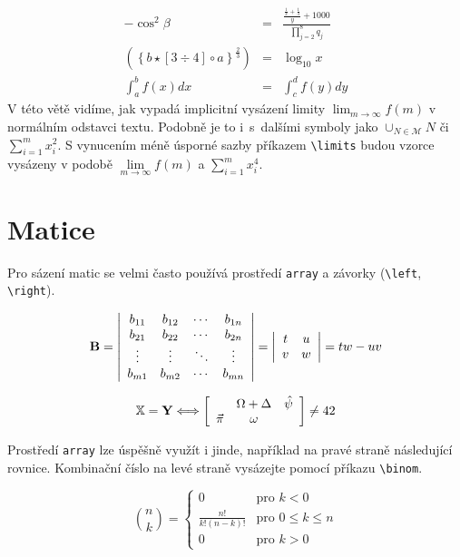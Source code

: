 \documentclass[twocolumn,11pt]{article}
\theoremstyle{definition}
\theoremstyle{plain}
\begin{document}
\begin{eqnarray}
- \cos^2 \beta & = & \frac{\frac{\frac{1}{x} + \frac{1}{3}}{y} + 1000}{\prod\limits^8_{j = 2} q_j} \\
\left(\left\{b \star \left[3 \div 4\right] \circ a \right\}^{\frac{2}{3}}\right) & = & \log_{10} x \\
\int_a^b f(x) dx & = & \int_c^d f(y) dy
\end{eqnarray}
V této větě vidíme, jak vypadá
implicitní vysázení limity $\lim_{m \rightarrow \infty} f(m)$ v normálním odstavci textu. Podobně je to i~s~dalšími symboly
jako $\cup_{N \in \mathcal{M}}N$ či $\sum_{i=1}^m x_i^2$. S vynucením méně úsporné sazby příkazem \verb|\limits| budou vzorce vysázeny v podobě
$\lim\limits_{m \rightarrow \infty} f(m)$ a $\sum\limits_{i=1}^m x_i^4$.

\section{Matice}
Pro sázení matic se velmi často používá prostředí \texttt{array}
 a závorky (\verb|\left|, \verb|\right|).

$$
\bold{B} =
\left|
\begin{array}{cccc}
    b_{11} & b_{12} & \cdots & b_{1n} \\
    b_{21} & b_{22} & \cdots & b_{2n} \\
    \vdots & \vdots & \ddots & \vdots \\
    b_{m1} & b_{m2} & \cdots & b_{mn}
\end{array}
\right|
=
\left|
\begin{array}{cc}
    t & u \\
    v & w
\end{array}
\right|
=
tw - uv
$$

$$
\mathbb{X} = \bold{Y} \Longleftrightarrow \left[
\begin{array}{ccc}
      & \Omega + \Delta & \hat{\psi} \\
    \vec{\pi} & \omega &
\end{array}
\right]
\neq 42
$$

Prostředí \verb|array| lze úspěšně využít i jinde, například na pravé straně následující
rovnice. Kombinační číslo na levé straně vysázejte pomocí příkazu \verb|\binom|.

$$
\binom{n}{k} =
\left\{
\begin{array}{cl}
    0 & \textrm{pro } k < 0 \\
    \frac{n!}{k!(n-k)!} & \textrm{pro } 0 \leq k \leq n \\
    0 & \textrm{pro } k > 0
\end{array}
\right.
$$
\end{document}

